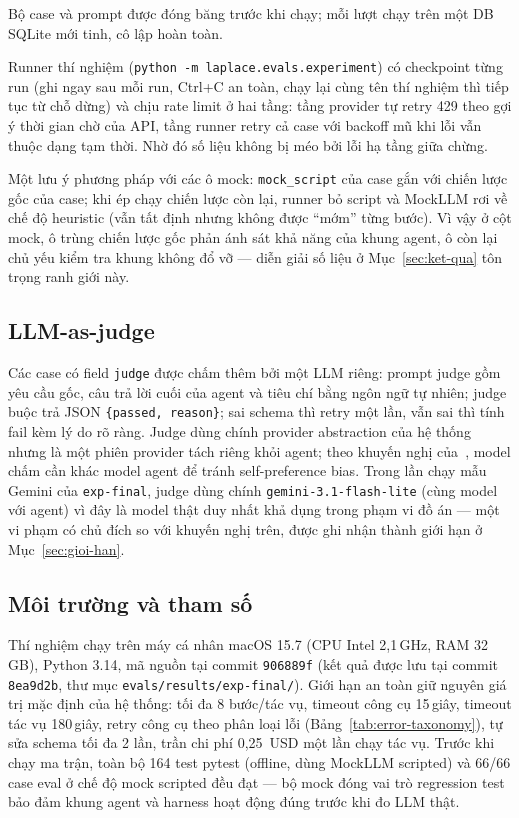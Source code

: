 Bộ case và prompt được đóng băng trước khi chạy; mỗi lượt chạy trên một DB
SQLite mới tinh, cô lập hoàn toàn.

Runner thí nghiệm (\texttt{python -m laplace.evals.experiment}) có
checkpoint từng run (ghi ngay sau mỗi run, Ctrl+C an toàn, chạy lại cùng tên
thí nghiệm thì tiếp tục từ chỗ dừng) và chịu rate limit ở hai tầng: tầng
provider tự retry 429 theo gợi ý thời gian chờ của API, tầng runner retry cả
case với backoff mũ khi lỗi vẫn thuộc dạng tạm thời. Nhờ đó số liệu không bị
méo bởi lỗi hạ tầng giữa chừng.

Một lưu ý phương pháp với các ô mock: \texttt{mock\_script} của case gắn với
chiến lược gốc của case; khi ép chạy chiến lược còn lại, runner bỏ script và
MockLLM rơi về chế độ heuristic (vẫn tất định nhưng không được ``mớm'' từng
bước). Vì vậy ở cột mock, ô trùng chiến lược gốc phản ánh sát khả năng của
khung agent, ô còn lại chủ yếu kiểm tra khung không đổ vỡ --- diễn giải số
liệu ở Mục~\ref{sec:ket-qua} tôn trọng ranh giới này.

\subsection{LLM-as-judge}
\label{sec:llm-judge}

Các case có field \texttt{judge} được chấm thêm bởi một LLM riêng: prompt
judge gồm yêu cầu gốc, câu trả lời cuối của agent và tiêu chí bằng ngôn ngữ
tự nhiên; judge buộc trả JSON \texttt{\{passed, reason\}}; sai schema thì
retry một lần, vẫn sai thì tính fail kèm lý do rõ ràng. Judge dùng chính
provider abstraction của hệ thống nhưng là một phiên provider tách riêng
khỏi agent; theo khuyến nghị của~\cite{zheng2023judge}, model chấm cần khác
model agent để tránh self-preference bias. Trong lần chạy mẫu Gemini của
\texttt{exp-final}, judge dùng chính \texttt{gemini-3.1-flash-lite} (cùng
model với agent) vì đây là model thật duy nhất khả dụng trong phạm vi đồ án
--- một vi phạm có chủ đích so với khuyến nghị trên, được ghi nhận thành
giới hạn ở Mục~\ref{sec:gioi-han}.

\subsection{Môi trường và tham số}

Thí nghiệm chạy trên máy cá nhân macOS 15.7 (CPU Intel 2{,}1\,GHz, RAM
32\,GB), Python 3.14, mã nguồn tại commit \texttt{906889f} (kết quả được
lưu tại commit \texttt{8ea9d2b}, thư mục
\texttt{evals/results/exp-final/}). Giới hạn an toàn giữ nguyên
giá trị mặc định của hệ thống: tối đa 8 bước/tác vụ, timeout công cụ
15\,giây, timeout tác vụ 180\,giây, retry công cụ theo phân loại lỗi
(Bảng~\ref{tab:error-taxonomy}), tự sửa schema tối đa 2 lần, trần chi phí
0{,}25~USD một lần chạy tác vụ. Trước khi chạy ma trận, toàn bộ 164 test
pytest (offline, dùng MockLLM scripted) và 66/66 case eval ở chế độ mock
scripted đều đạt --- bộ mock đóng vai trò regression test bảo đảm khung
agent và harness hoạt động đúng trước khi đo LLM thật.
